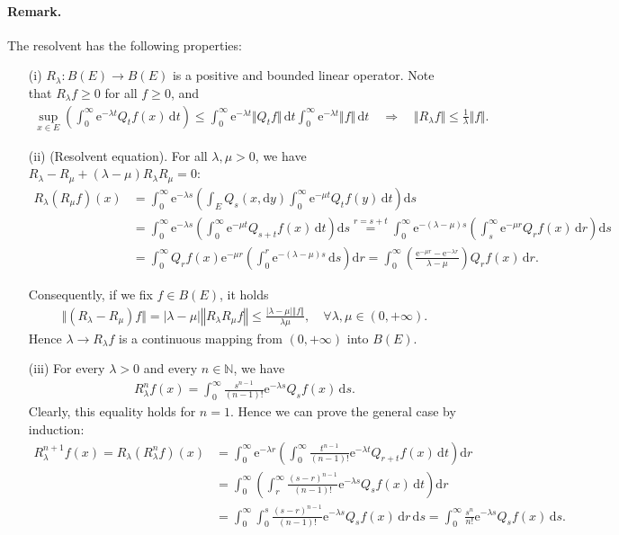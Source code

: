 \documentclass{article}
\numberwithin{equation}{section}
\newcommand{\e}{\mathrm{e}}
\renewcommand{\d}{\mathrm{d}}
\theoremstyle{plain}
\theoremstyle{definition}
\begin{document}
\paragraph{Remark.} The resolvent has the following properties:
\begin{itemize}
	\item[(i)] $R_\lambda:B(E)\to B(E)$ is a positive and bounded linear operator. Note that $R_\lambda f\geq 0$ for all $f\geq 0$, and
	\begin{align*}
		 \sup_{x\in E}\left(\int_0^\infty\e^{-\lambda t}Q_tf(x)\,\d t\right) \leq \int_0^\infty\e^{-\lambda t}\Vert Q_t f\Vert\,\d t \int_0^\infty\e^{-\lambda t}\Vert f\Vert\,\d t\quad\Rightarrow\quad \Vert R_\lambda f\Vert\leq \frac{1}{\lambda}\Vert f\Vert.
	\end{align*}
	\item[(ii)] (Resolvent equation). For all $\lambda,\mu>0$, we have $R_\lambda-R_\mu + (\lambda-\mu)R_\lambda R_\mu = 0$:
	\begin{align*}
		R_\lambda(R_\mu f)(x) &= \int_0^\infty\e^{-\lambda s}\left(\int_E Q_s(x,\d y)\int_0^\infty \e^{-\mu t}Q_tf(y)\,\d t\right)\d s\\
		&=\int_0^\infty\e^{-\lambda s}\left(\int_0^\infty\e^{-\mu t} Q_{s+t} f(x)\,\d t\right)\d s \overset{r=s+t}{=} \int_0^\infty\e^{-(\lambda-\mu)s}\left(\int_s^\infty\e^{-\mu r} Q_{r} f(x)\,\d r\right)\d s\\
		&= \int_0^\infty Q_rf(x)\e^{-\mu r}\left(\int_0^r\e^{-(\lambda-\mu)s}\,\d s\right)\d r = \int_0^\infty \left(\frac{\e^{-\mu r}-\e^{-\lambda r}}{\lambda-\mu}\right)Q_rf(x)\,\d r.
	\end{align*}
	
	Consequently, if we fix $f\in B(E)$, it holds
	\begin{align*}
		\Vert(R_\lambda-R_\mu)f\Vert=\vert\lambda-\mu\vert\left\Vert R_\lambda R_\mu f\right\Vert\leq\frac{\vert\lambda-\mu\vert\left\Vert f\right\Vert}{\lambda\mu},\quad\forall \lambda,\mu\in(0,+\infty).
	\end{align*}
	Hence $\lambda\to R_\lambda f$ is a continuous mapping from $(0,+\infty)$ into $B(E)$.
	\item[(iii)] For every $\lambda>0$ and every $n\in\mathbb{N}$, we have
	\begin{align*}
		R_\lambda^nf(x) = \int_0^\infty\frac{s^{n-1}}{(n-1)!}\e^{-\lambda s}Q_sf(x)\,\d s.
	\end{align*}
     Clearly, this equality holds for $n=1$. Hence we can prove the general case by induction:
     \begin{align*}
     	R_\lambda^{n+1}f(x) = R_\lambda(R_\lambda^nf)(x)&= \int_0^\infty\e^{-\lambda r}\left(\int_0^\infty\frac{t^{n-1}}{(n-1)!}\e^{-\lambda t}Q_{r+t}f(x)\,\d t\right)\d r\\
     	&=\int_0^\infty\left(\int_r^\infty\frac{(s-r)^{n-1}}{(n-1)!}\e^{-\lambda s}Q_sf(x)\,\d t\right)\d r\\
     	&=\int_0^\infty\int_0^s\frac{(s-r)^{n-1}}{(n-1)!}\e^{-\lambda s}Q_sf(x)\,\d r\,\d s = \int_0^\infty\frac{s^n}{n!}\e^{-\lambda s}Q_sf(x)\,\d s.
     \end{align*}
\end{itemize}
\end{document}
